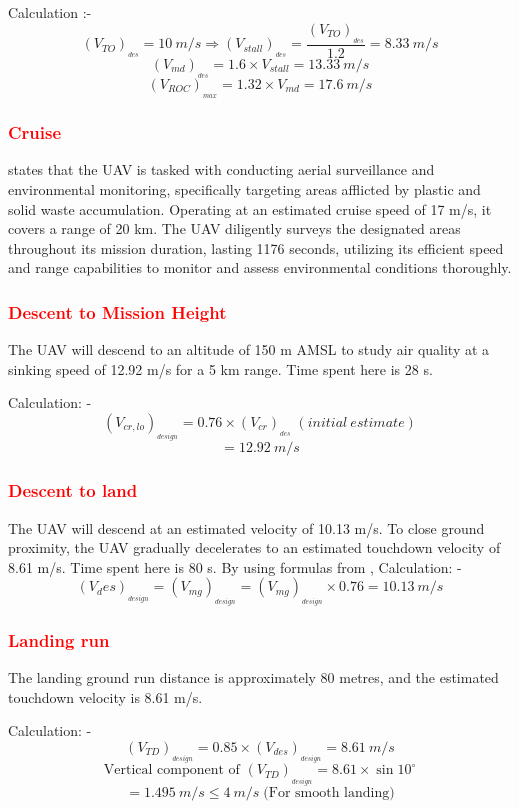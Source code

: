 \documentclass[12 pt]{article}
\begin{document}
Calculation :- 
$$ (V_{TO})_{_{des}} = 10 \: m/s \Rightarrow (V_{stall})_{_{des}} = \frac{(V_{TO})_{_{des}}}{1.2} = 8.33 \: m/s $$
$$ (V_{md})_{_{des}} = 1.6 \times V_{stall} = 13.33 \: m/s $$
$$ (V_{ROC})_{_{max}} = 1.32 \times V_{md} = 17.6 \: m/s $$

\subsubsection{\textcolor{red}{Cruise}}
\cite{alhajjaji2017design} states that the UAV is tasked with conducting aerial surveillance and environmental monitoring, specifically targeting areas afflicted by plastic and solid waste accumulation. Operating at an estimated cruise speed of 17 m/s, it covers a range of 20 km. The UAV diligently surveys the designated areas throughout its mission duration, lasting 1176 seconds, utilizing its efficient speed and range capabilities to monitor and assess environmental conditions thoroughly.

\subsubsection{\textcolor{red}{Descent to Mission Height}}
The UAV will descend to an altitude of 150 m AMSL to study air quality at a sinking speed of 12.92 m/s for a 5 km range. Time spent here is 28 s.

Calculation: - 
$$(V_{cr,lo})_{_{design}} = 0.76 \times (V_{cr})_{_{des}} \;  (initial \: estimate) $$
$$ = 12.92 \: m/s $$

\subsubsection{\textcolor{red}{Descent to land}}
The UAV will descend at an estimated velocity of 10.13 m/s. To close ground proximity, the UAV gradually decelerates to an estimated touchdown velocity of 8.61 m/s. Time spent here is 80 s. By using formulas from \cite{Anderson1},
Calculation: - 
$$(V_des)_{_{design}} = (V_{mg})_{_{design}} = (V_{mg})_{_{design}} \times 0.76 = 10.13 \: m/s $$

\subsubsection{\textcolor{red}{Landing run}}
The landing ground run distance is approximately 80 metres, and the estimated touchdown velocity is 8.61 m/s.

Calculation: - 
$$ (V_{TD})_{_{design}} = 0.85 \times (V_{des})_{_{design}} = 8.61 \: m/s  $$
$$ \text{Vertical component of } (V_{TD})_{_{design}} = 8.61 \times \sin{10^{\circ}} $$
$$ = 1.495 \: m/s \leq 4 \: m/s \; \text{(For smooth landing)} $$
\end{document}
